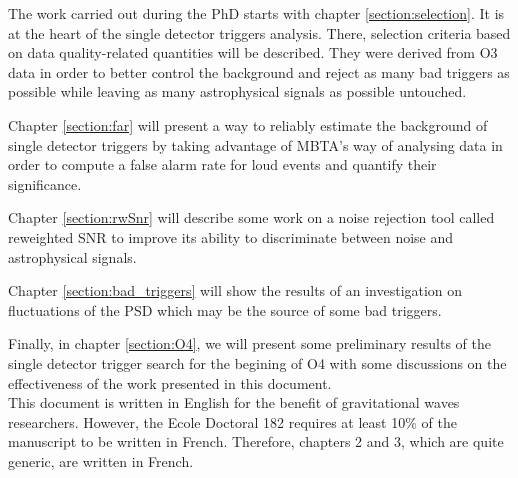 The work carried out during the PhD starts with chapter \ref{section:selection}.
It is at the heart of the single detector triggers analysis. There, selection criteria based on data quality-related quantities will be described.
They were derived from O3 data in order to better control the background and reject as many bad triggers as possible while leaving as many astrophysical signals as possible untouched.

Chapter \ref{section:far} will present a way to reliably estimate the background of single detector triggers by taking advantage of MBTA's way of analysing data in order to compute a false alarm rate for loud events and quantify their significance.

Chapter \ref{section:rwSnr} will describe some work on a noise rejection tool called reweighted SNR to improve its ability to discriminate between noise and astrophysical signals.

Chapter \ref{section:bad_triggers} will show the results of an investigation on fluctuations of the PSD which may be the source of some bad triggers.

Finally, in chapter \ref{section:O4}, we will present some preliminary results of the single detector trigger search for the begining of O4 with some discussions on the effectiveness of the work presented in this document.\\

This document is written in English for the benefit of gravitational waves researchers.
However, the Ecole Doctoral 182 requires at least 10\% of the manuscript to be written in French.
Therefore, chapters 2 and 3, which are quite generic, are written in French.
